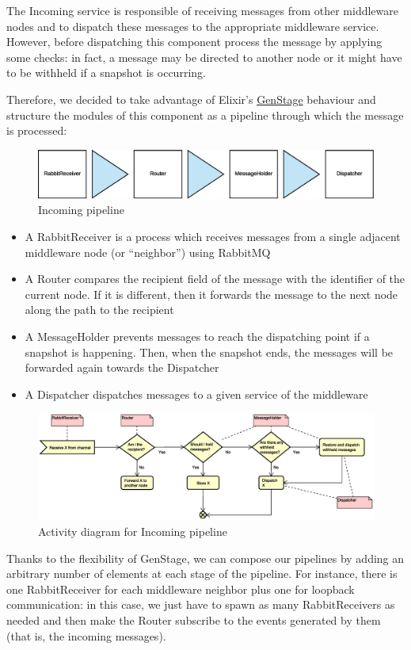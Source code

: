 The Incoming service is responsible of receiving messages from other
middleware nodes and to dispatch these messages to the appropriate middleware
service.
However, before dispatching this component process the message by applying some
checks: in fact, a message may be directed to another node or it might have to
be withheld if a snapshot is occurring.

Therefore, we decided to take advantage of Elixir's
\href{https://hexdocs.pm/gen_stage/GenStage.html}{GenStage} behaviour and
structure the modules of this component as a pipeline through which the
message is processed:

\begin{figure}[H]
  \centering
  \includegraphics[width=\columnwidth]{images/solution/mw/inc/architect.eps}
  \caption{Incoming pipeline}
  \label{fig:mw-incoming}
\end{figure}

\begin{itemize}
  \item A RabbitReceiver is a process which receives messages from a single
    adjacent middleware node (or ``neighbor'') using RabbitMQ
  \item A Router compares the recipient field of the message with the
    identifier of the current node. If it is different, then it forwards the
    message to the next node along the path to the recipient
  \item A MessageHolder prevents messages to reach the dispatching point if a
    snapshot is happening. Then, when the snapshot ends, the messages will be
    forwarded again towards the Dispatcher
  \item A Dispatcher dispatches messages to a given service of the middleware
\end{itemize}

\begin{figure}[H]
  \centering
  \includegraphics[width=\columnwidth]{images/solution/mw/inc/activity.eps}
  \caption{Activity diagram for Incoming pipeline}
  \label{fig:mw-incoming-activity}
\end{figure}

Thanks to the flexibility of GenStage, we can compose our pipelines by adding
an arbitrary number of elements at each stage of the pipeline. For instance,
there is one RabbitReceiver for each middleware neighbor plus one for loopback
communication: in this case, we just have to spawn as many RabbitReceivers as
needed and then make the Router subscribe to the events generated by them
(that is, the incoming messages).
